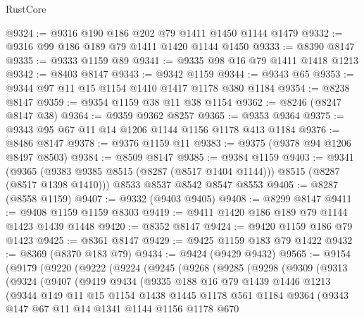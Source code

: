\begin{lexlean}{RustCore}
\begin{coremodule}
@9324 := @9316 @190 @186 @202 @79 @1411 @1450 @1144 @1479
@9332 := @9316 @99 @186 @189 @79 @1411 @1420 @1144 @1450
@9333 := @8390 @8147
@9335 := @9333 @1159 @89
@9341 := @9335 @98 @16 @79 @1411 @1418 @1213
@9342 := @8403 @8147
@9343 := @9342 @1159
@9344 := @9343 @65
@9353 := @9344 @97 @11 @15 @1154 @1410 @1417 @1178 @380 @1184
@9354 := @8238 @8147
@9359 := @9354 @1159 @38 @11 @38 @1154
@9362 := @8246 (@8247 @8147 @38)
@9364 := @9359 @9362 @8257
@9365 := @9353 @9364
@9375 := @9343 @95 @67 @11 @14 @1206 @1144 @1156 @1178 @413 @1184
@9376 := @8486 @8147
@9378 := @9376 @1159 @11
@9383 := @9375 (@9378 @94 @1206 @8497 @8503)
@9384 := @8509 @8147
@9385 := @9384 @1159
@9403 := @9341
    (@9365 (@9383 @9385 @8515 (@8287 (@8517 @1404 @1144))) @8515 (@8287 (@8517 @1398 @1410)))
    @8533
    @8537
    @8542
    @8547
    @8553
@9405 := @8287 (@8558 @1159)
@9407 := @9332 (@9403 @9405)
@9408 := @8299 @8147
@9411 := @9408 @1159 @1159 @8303
@9419 := @9411 @1420 @186 @189 @79 @1144 @1423 @1439 @1448
@9420 := @8352 @8147
@9424 := @9420 @1159 @186 @79 @1423
@9425 := @8361 @8147
@9429 := @9425 @1159 @183 @79 @1422
@9432 := @8369 (@8370 @183 @79)
@9434 := @9424 (@9429 @9432)
@9565 := @9154
    (@9179
      (@9220
        (@9222
          (@9224
            (@9245
              (@9268
                (@9285
                  (@9298
                    (@9309
                      (@9313
                        (@9324
                          (@9407
                            (@9419
                              @9434
                              (@9335
                                @188
                                @16
                                @79
                                @1439
                                @1446
                                @1213
                                (@9344
                                  @149
                                  @11
                                  @15
                                  @1154
                                  @1438
                                  @1445
                                  @1178
                                  @561
                                  @1184
                                  @9364
                                  (@9343
                                    @147
                                    @67
                                    @11
                                    @14
                                    @1341
                                    @1144
                                    @1156
                                    @1178
                                    @670

\end{coremodule}
\end{lexlean}
